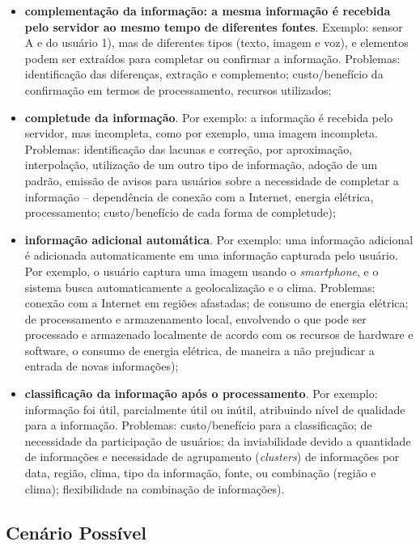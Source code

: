 \documentclass[12pt]{article}
\begin{document}
\begin{itemize}
\begin{itemize}
			\item \textbf{complementação da informação: a mesma informação é recebida pelo servidor ao mesmo tempo de diferentes fontes}. Exemplo: sensor A e do usuário 1), mas de diferentes tipos (texto, imagem e voz), e elementos podem ser extraídos para completar ou confirmar a informação. Problemas: identificação das diferenças, extração e complemento; custo/benefício da  confirmação em termos de processamento, recursos utilizados;
			\item \textbf{completude da informação}. Por exemplo: a informação é recebida pelo servidor, mas incompleta, como por exemplo, uma imagem incompleta. Problemas: identificação das lacunas e correção, por aproximação, interpolação, utilização de um outro tipo de informação, adoção de um padrão, emissão de avisos para usuários sobre a necessidade de completar a informação – dependência de conexão com a Internet, energia elétrica, processamento; custo/benefício de cada forma de completude);
			\item \textbf{informação adicional automática}. Por exemplo: uma informação adicional é adicionada automaticamente em uma informação capturada pelo usuário. Por exemplo, o usuário captura uma imagem usando o \textit{smartphone}, e o sistema busca automaticamente a geolocalização e o clima. Problemas: conexão com a Internet em regiões afastadas; de consumo de energia elétrica; de processamento e armazenamento local, envolvendo o que pode ser processado e armazenado localmente de acordo com os recursos de hardware e software, o consumo de energia elétrica, de maneira a não prejudicar a entrada de novas informações);
			\item \textbf{classificação da informação após o processamento}. Por exemplo: informação foi útil, parcialmente útil ou inútil, atribuindo nível de qualidade para a informação. Problemas: custo/benefício para a classificação; de necessidade da participação de usuários; da inviabilidade devido a quantidade de informações e necessidade de agrupamento (\textit{clusters}) de informações por data, região, clima, tipo da informação, fonte, ou combinação (região e clima); flexibilidade na combinação de informações).
		\end{itemize}
\end{itemize}

\subsection{Cenário Possível}
\label{subsec:cenario_possivel}
\end{document}
